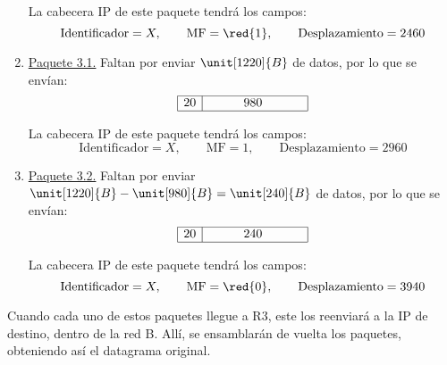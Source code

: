 \begin{ejemplo}
\begin{enumerate}
        La cabecera IP de este paquete tendrá los campos:
        \begin{equation*}
            \text{Identificador} = X,\qquad \text{MF} = \red{1},\qquad \text{Desplazamiento} = 2460
        \end{equation*}

        \item \ul{Paquete 3.1.} Faltan por enviar $\unit[1220]{B}$ de datos, por lo que se envían:
        \begin{equation*}
            \begin{array}{|c|c|}
                \hline 20 & \hspace{1cm} 980 \hspace{1cm}~\\ \hline
            \end{array}
        \end{equation*}

        La cabecera IP de este paquete tendrá los campos:
        \begin{equation*}
            \text{Identificador} = X,\qquad \text{MF} = 1,\qquad \text{Desplazamiento} = 2960
        \end{equation*}

        \item \ul{Paquete 3.2.} Faltan por enviar $\unit[1220]{B}-\unit[980]{B}=\unit[240]{B}$ de datos, por lo que se envían:
        \begin{equation*}
            \begin{array}{|c|c|}
                \hline 20 & \hspace{1cm} 240 \hspace{1cm}~\\ \hline
            \end{array}
        \end{equation*}

        La cabecera IP de este paquete tendrá los campos:
        \begin{equation*}
            \text{Identificador} = X,\qquad \text{MF} = \red{0},\qquad \text{Desplazamiento} = 3940
        \end{equation*}
    \end{enumerate}

    Cuando cada uno de estos paquetes llegue a R3, este los reenviará a la IP de destino, dentro de la red B. Allí, se ensamblarán de vuelta los paquetes, obteniendo así el datagrama original.
\end{ejemplo}


